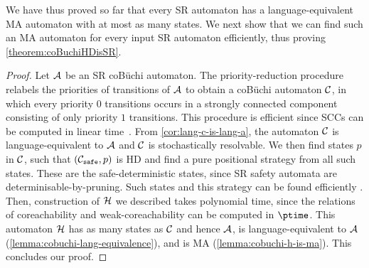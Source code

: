 We have thus proved so far that every SR automaton has a language-equivalent MA automaton with at most as many states. We next show that we can find such an MA automaton for every input SR automaton efficiently, thus proving \cref{theorem:coBuchiHDisSR}.
\theoremcobuchisrtoma*
\begin{proof}
    Let $\mathcal{A}$ be an SR coB\"uchi automaton. The priority-reduction procedure relabels the priorities of transitions of  $\mathcal{A}$ to obtain a coB\"uchi automaton $\mathcal{C}$, in which every priority $0$ transitions occurs in a strongly connected component consisting of only priority $1$ transitions. This procedure is efficient since SCCs can be computed in linear time~\cite{Tar72}. From \cref{cor:lang-c-is-lang-a}, the automaton $\mathcal{C}$ is language-equivalent to $\mathcal{A}$ and $\mathcal{C}$ is stochastically resolvable. We then find states $p$ in $\mathcal{C}$, such that $(\mathcal{C}_{\texttt{safe}},p)$ is HD and find a pure positional strategy from all such states. These are the safe-deterministic states, since SR safety automata are determinisable-by-pruning. Such states and this strategy can be found efficiently \cite[Theorem 4.5]{BL23quantitative}. Then, construction of $\mathcal{H}$ we described takes polynomial time, since the relations of coreachability and weak-coreachability can be computed in $\ptime$. This automaton $\mathcal{H}$ has as many states as $\mathcal{C}$ and hence $\mathcal{A}$, is language-equivalent to $\mathcal{A}$ (\cref{lemma:cobuchi-lang-equivalence}), and is MA (\cref{lemma:cobuchi-h-is-ma}). This concludes our proof.
\end{proof}
